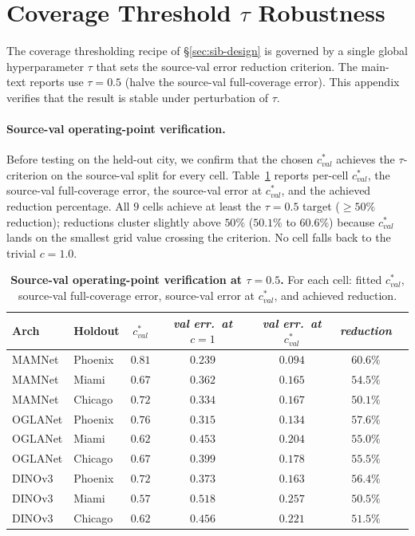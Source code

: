 \section{Coverage Threshold $\tau$ Robustness}
\label{app:tau-sweep}

The coverage thresholding recipe of \S\ref{sec:sib-design} is governed by a single global hyperparameter $\tau$ that sets the source-val error reduction criterion. The main-text reports use $\tau = 0.5$ (halve the source-val full-coverage error). This appendix verifies that the result is stable under perturbation of $\tau$.

\paragraph{Source-val operating-point verification.} Before testing on the held-out city, we confirm that the chosen $c^*_{val}$ achieves the $\tau$-criterion on the source-val split for every cell. Table~\ref{tab:tau-cstar-val} reports per-cell $c^*_{val}$, the source-val full-coverage error, the source-val error at $c^*_{val}$, and the achieved reduction percentage. All $9$ cells achieve at least the $\tau = 0.5$ target ($\geq 50\%$ reduction); reductions cluster slightly above $50\%$ ($50.1\%$ to $60.6\%$) because $c^*_{val}$ lands on the smallest grid value crossing the criterion. No cell falls back to the trivial $c = 1.0$.

\begin{table}[h]
\centering
\small
\setlength{\tabcolsep}{8pt}
\caption{\textbf{Source-val operating-point verification at $\tau = 0.5$.} For each cell: fitted $c^*_{val}$, source-val full-coverage error, source-val error at $c^*_{val}$, and achieved reduction.}
\label{tab:tau-cstar-val}
\begin{tabular}{llccccc}
\toprule
\textbf{Arch} & \textbf{Holdout} & \textit{$c^*_{val}$} & \textit{val err.\ at $c=1$} & \textit{val err.\ at $c^*_{val}$} & \textit{reduction} \\
\midrule
MAMNet  & Phoenix & $0.81$ & $0.239$ & $0.094$ & $60.6\%$ \\
MAMNet  & Miami   & $0.67$ & $0.362$ & $0.165$ & $54.5\%$ \\
MAMNet  & Chicago & $0.72$ & $0.334$ & $0.167$ & $50.1\%$ \\
OGLANet & Phoenix & $0.76$ & $0.315$ & $0.134$ & $57.6\%$ \\
OGLANet & Miami   & $0.62$ & $0.453$ & $0.204$ & $55.0\%$ \\
OGLANet & Chicago & $0.67$ & $0.399$ & $0.178$ & $55.5\%$ \\
DINOv3  & Phoenix & $0.72$ & $0.373$ & $0.163$ & $56.4\%$ \\
DINOv3  & Miami   & $0.57$ & $0.518$ & $0.257$ & $50.5\%$ \\
DINOv3  & Chicago & $0.62$ & $0.456$ & $0.221$ & $51.5\%$ \\
\bottomrule
\end{tabular}
\end{table}

